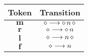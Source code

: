 \begin{tabular}{c|c}
    Token & Transition\\
    \hline
    $\mathbf{m}$ & $\diamond \longrightarrow \diamond\,n \,\diamond$\\
    $\mathbf{r}$ & $\diamond \longrightarrow \diamond\,n$\\
    $\mathbf{l}$ & $\diamond \longrightarrow n\,\diamond$\\
    $\mathbf{f}$ & $\diamond \longrightarrow n$
\end{tabular}